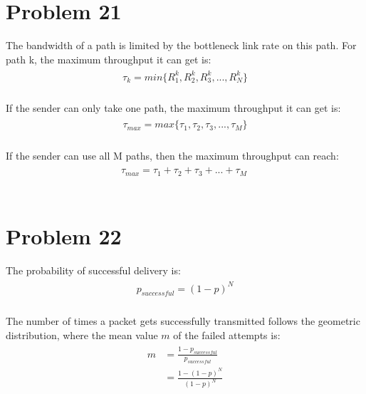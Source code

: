 \documentclass[titlepage, paper=a4, fontsize=11pt]{scrartcl} %
\numberwithin{equation}{section} %
\numberwithin{figure}{section} %
\numberwithin{table}{section} %
\begin{document}
\section*{Problem 21}
The bandwidth of a path is limited by the bottleneck link rate on this path. For path k, the maximum throughput it can get is:
\begin{align*} 
\begin{split}
\tau_k = min\{ R^k_1, R^k_2, R^k_3, ..., R^k_N \}
\end{split}					
\end{align*}
\\
If the sender can only take one path, the maximum throughput it can get is:
\begin{align*} 
\begin{split}
\tau_{max} = max\{ \tau_1, \tau_2, \tau_3, ..., \tau_M \}
\end{split}					
\end{align*}
\\
If the sender can use all M paths, then the maximum throughput can reach:
\begin{align*} 
\begin{split}
\tau_{max} = \tau_1 + \tau_2 + \tau_3 + ... + \tau_M \
\end{split}					
\end{align*}
\\



\section*{Problem 22}
The probability of successful delivery is:
\begin{align*} 
\begin{split}
p_{successful} = (1-p)^N
\end{split}					
\end{align*}
\\
The number of times a packet gets successfully transmitted follows the geometric distribution, where the mean value $m$ of the failed attempts is:
\begin{align*} 
\begin{split}
m &= \frac{1-p_{successful}}{p_{successful}} \\
&= \frac{1-(1-p)^N}{(1-p)^N}
\end{split}					
\end{align*}
\\
\end{document}

